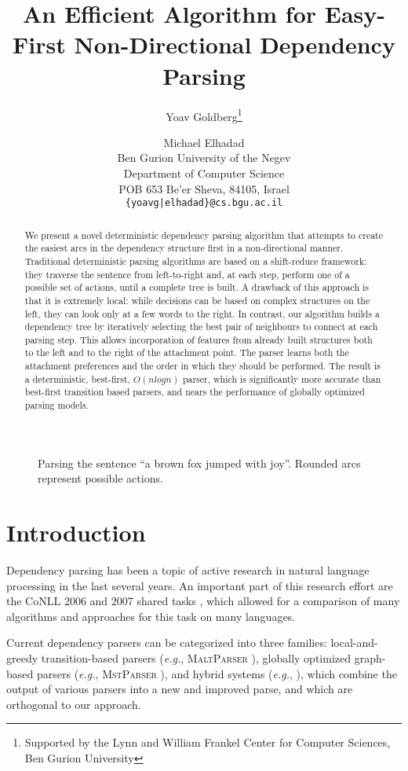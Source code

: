 \documentclass[11pt]{article}
\title{An Efficient Algorithm for Easy-First Non-Directional Dependency Parsing}
\author{Yoav Goldberg\thanks{\hskip 0.05in Supported by the Lynn and William Frankel Center for Computer Sciences, Ben Gurion University} \and Michael Elhadad \\
Ben Gurion University of the Negev \\
Department of Computer Science \\
POB 653 Be'er Sheva, 84105, Israel \\
{\tt \{yoavg|elhadad\}@cs.bgu.ac.il} }
\date{}
\begin{document}
\maketitle
\begin{abstract}
   We present a novel deterministic dependency parsing algorithm that attempts to create the easiest arcs in the dependency structure first in a non-directional manner.  Traditional deterministic parsing algorithms are based on a shift-reduce framework: they traverse the sentence from left-to-right and, at each step, perform one of a possible set of actions, until a complete tree is built.  A drawback of this approach is that it is extremely local: while decisions can be based on complex structures on the left, they can look only at a few words to the right.  In contrast, our algorithm builds a dependency tree by iteratively selecting the best pair of neighbours to connect at each parsing step.  This allows incorporation of features from already built structures both to the left and to the right of the attachment point.  The parser learns both the attachment preferences and the order in which they should be performed.  The result is a deterministic, best-first, $O(nlogn)$ parser, which is significantly more accurate than best-first transition based parsers, and nears the performance of globally optimized parsing models.
\end{abstract}

\begin{figure*}[t]

   \begin{center}
   \scalebox{0.65}{
      
   }
\end{center}
\caption{Parsing the sentence ``a brown fox jumped with joy''.  %
Rounded arcs represent possible actions.}
   \label{example:fox}
\end{figure*}

\section{Introduction}

Dependency parsing has been a topic of active research in natural language processing in the last several years.  An important part of this research effort are the CoNLL 2006 and 2007 shared tasks \cite{conll2006,conll2007}, which allowed for a comparison of many algorithms and approaches for this task on many languages.  

Current dependency parsers can be categorized into three families: local-and-greedy transition-based parsers ({\em e.g.}, \textsc{MaltParser} \cite{malt}), globally optimized graph-based parsers ({\em e.g.}, \textsc{MstParser} \cite{mst}), and hybrid systems ({\em e.g.}, \cite{kenji-reparsing,nivre-mcdonald}), which combine the output of various parsers into a new and improved parse, and which are orthogonal to our approach.
\end{document}
